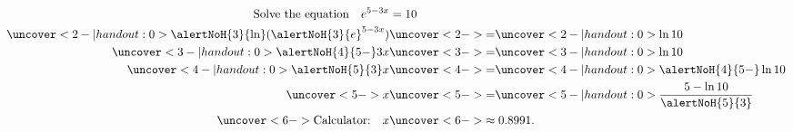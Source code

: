 \begin{frame}
\begin{example}
\begin{align*}
\text{Solve the equation} \quad e^{5-3x} & =  10 \\
\uncover<2-| handout:0>{\alertNoH{3}{\ln} ({\alertNoH{3}{e}}^{5-3x})} & \uncover<2->{=}  \uncover<2-| handout:0>{\ln 10} \\
\uncover<3-| handout:0>{\alertNoH{4}{5-}3x} & \uncover<3->{=}  \uncover<3-| handout:0>{\ln 10} \\
\uncover<4-| handout:0>{\alertNoH{5}{3}x} & \uncover<4->{=}  \uncover<4-| handout:0>{\alertNoH{4}{5-}\ln 10} \\
\uncover<5->{x} & \uncover<5->{=}  \uncover<5-| handout:0>{\frac{5-\ln 10}{\alertNoH{5}{3}}} \\
\uncover<6->{\text{Calculator:}\quad x} & \uncover<6->{\approx 0.8991.}
\end{align*}
\end{example}
\end{frame}
